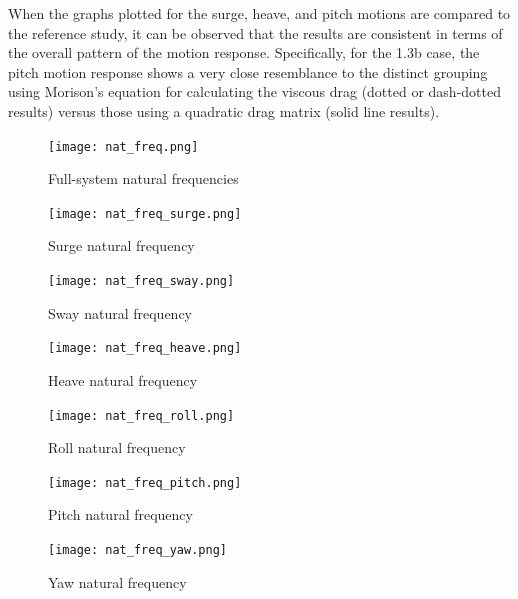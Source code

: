 \documentclass[a4paper, 11pt]{article}
\begin{document}
When the graphs plotted for the surge, heave, and pitch motions are compared to the reference study, it can be observed that the results are consistent in terms of the overall pattern of the motion response. Specifically, for the 1.3b case, the pitch motion response shows a very close resemblance to the distinct grouping using Morison’s equation for calculating the viscous drag (dotted or dash-dotted results) versus those using a quadratic drag matrix (solid line results).


\begin{figure}[H]
    \centering
    \texttt{[image: nat\_freq.png]}
    \caption{\small Full-system natural frequencies \cite{Robertson2014}}
    \label{fig:nat_freq}
\end{figure}

\begin{figure}[H]
    \begin{minipage}{0.49\textwidth}
        \centering
        \texttt{[image: nat\_freq\_surge.png]}
        \caption{\small Surge natural frequency}
        \label{fig:nat_freq_surge}
    \end{minipage}
    \hfill
    \begin{minipage}{0.5\textwidth}
        \centering
        \texttt{[image: nat\_freq\_sway.png]}
        \caption{\small Sway natural frequency}
        \label{fig:nat_freq_sway}
    \end{minipage}
\end{figure}

\begin{figure}[H]
    \begin{minipage}{0.49\textwidth}
        \centering
        \texttt{[image: nat\_freq\_heave.png]}
        \caption{\small Heave natural frequency}
        \label{fig:nat_freq_heave}
    \end{minipage}
    \hfill
    \begin{minipage}{0.5\textwidth}
        \centering
        \texttt{[image: nat\_freq\_roll.png]}
        \caption{\small Roll natural frequency}
        \label{fig:nat_freq_roll}
    \end{minipage}
\end{figure}

\begin{figure}[H]
    \begin{minipage}{0.49\textwidth}
        \centering
        \texttt{[image: nat\_freq\_pitch.png]}
        \caption{\small Pitch natural frequency}
        \label{fig:nat_freq_pitch}
    \end{minipage}
    \hfill
    \begin{minipage}{0.5\textwidth}
        \centering
        \texttt{[image: nat\_freq\_yaw.png]}
        \caption{\small Yaw natural frequency}
        \label{fig:nat_freq_yaw}
    \end{minipage}
\end{figure}
\end{document}
